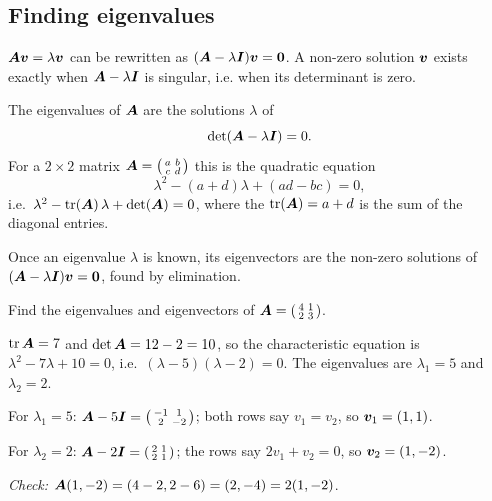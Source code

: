 \subsection{Finding eigenvalues}

$\bm{A}\bm{v} = \lambda\bm{v}$ can be rewritten as $(\bm{A} - \lambda\bm{I})\bm{v} = \bm{0}$. A
non-zero solution $\bm{v}$ exists exactly when $\bm{A} - \lambda\bm{I}$ is singular, i.e.
when its determinant is zero.

\begin{theorem}\label{thm:characteristic}
The eigenvalues of $\bm{A}$ are the solutions $\lambda$ of
\[
  \det(\bm{A} - \lambda\bm{I}) = 0 .
\]
For a $2\times2$ matrix $\bm{A} = \left(\begin{smallmatrix} a & b\\ c &
d\end{smallmatrix}\right)$ this is the quadratic equation
\[
  \lambda^2 - (a + d)\lambda + (ad - bc) = 0,
\]
i.e.\ $\lambda^2 - \operatorname{tr}(\bm{A})\,\lambda + \det(\bm{A}) = 0$, where the 
$\operatorname{tr}(\bm{A}) = a + d$ is the sum of the diagonal entries.
\end{theorem}

Once an eigenvalue $\lambda$ is known, its eigenvectors are the non-zero
solutions of $(\bm{A} - \lambda\bm{I})\bm{v} = \bm{0}$, found by elimination.

\begin{example}\label{ex:eigen-computation}
Find the eigenvalues and eigenvectors of $\bm{A} = \left(\begin{smallmatrix} 4 &
1\\ 2 & 3\end{smallmatrix}\right)$.

\sol $\operatorname{tr}\bm{A} = 7$ and $\det\bm{A} = 12 - 2 = 10$, so the characteristic equation is
$\lambda^2 - 7\lambda + 10 = 0$, i.e.\ $(\lambda - 5)(\lambda - 2) = 0$. The
eigenvalues are $\lambda_1 = 5$ and $\lambda_2 = 2$.

For $\lambda_1 = 5$: $\bm{A} - 5\bm{I} = \left(\begin{smallmatrix} -1 & 1\\ 2 &
-2\end{smallmatrix}\right)$; both rows say $v_1 = v_2$, so $\bm{v}_1 = (1, 1)$.

For $\lambda_2 = 2$: $\bm{A} - 2\bm{I} = \left(\begin{smallmatrix} 2 & 1\\ 2 &
1\end{smallmatrix}\right)$; the rows say $2v_1 + v_2 = 0$, so
$\bm{v}_2 = (1, -2)$.

\emph{Check:} $\bm{A}(1, -2) = (4 - 2, 2 - 6) = (2, -4) = 2(1, -2)$. \checkmark
\end{example}

